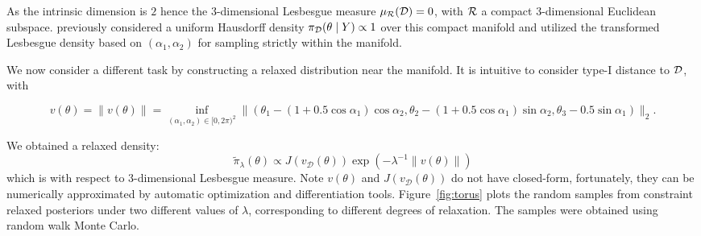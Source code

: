 \documentclass[10pt,fleqn]{article}
\DeclareMathOperator{\1}{\mathbbm{1}} \DeclareMathOperator{\bigO}{\mc O}
\begin{document}
As the intrinsic dimension is $2$ hence
 the $3$-dimensional Lesbesgue measure $\mu_{\mathcal{R}}(\mathcal{D})=0$, with  $\mathcal{R}$ a compact $3$-dimensional Euclidean subspace. \cite{diaconis2013manifold} previously considered a uniform Hausdorff density $\pi_{\mathcal{D} }(\theta \mid Y) \propto 1$ over this compact manifold and utilized the transformed Lesbesgue density based on $(\alpha_1,\alpha_2)$ for sampling strictly within the manifold.

We now consider a different task by constructing a relaxed distribution near the manifold. It is intuitive to consider type-I distance to $\mathcal{D}$, with

$$v(\theta) =\|v(\theta)\|=\underset{  (\alpha_1,\alpha_2)\in [0,2\pi)^2}{\inf} \| (\theta_1-(1+ 0.5\cos\alpha_1) \cos\alpha_2 ,\theta_2 -  (1+ 0.5\cos\alpha_1) \sin\alpha_2,\theta_3
- 0.5\sin\alpha_1)\|_2.$$

We obtained a relaxed density:
$$\tilde\pi_{\lambda}(\theta) \propto {J(v_\mathcal{D}(\theta))\exp(-\lambda^{-1}\|v(\theta)\|)}$$
which is with respect to $3$-dimensional Lesbesgue measure. Note $v(\theta)$ and $J(v_\mathcal{D}(\theta))$ do not have closed-form,
fortunately, they can be numerically approximated by automatic optimization and differentiation tools. Figure~\ref{fig:torus}
plots the random samples from constraint relaxed posteriors
under two different values of $\lambda$, corresponding to different degrees of relaxation. The samples
were obtained using random walk Monte Carlo.
\end{document}
